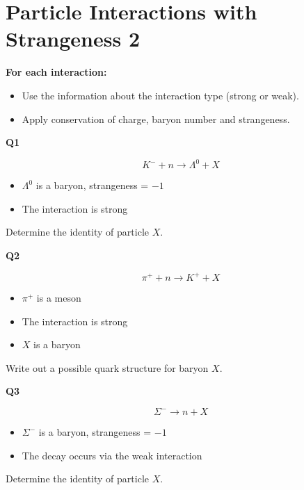 \documentclass[12pt]{article}
\begin{document}
\section*{Particle Interactions with Strangeness 2}

\textbf{For each interaction:}

\begin{itemize}
    \item Use the information about the interaction type (strong or weak).
    \item Apply conservation of charge, baryon number and strangeness.
\end{itemize}

\vspace{1em}

\textbf{Q1}

\[
K^- + n \rightarrow \Lambda^0 + X
\]

\begin{itemize}
    \item $\Lambda^0$ is a baryon, strangeness = $-1$
    \item The interaction is strong
\end{itemize}

Determine the identity of particle $X$.

\vspace{3em}

\textbf{Q2}

\[
\pi^+ + n \rightarrow K^+ + X
\]

\begin{itemize}
    \item $\pi^+$ is a meson
    \item The interaction is strong
    \item $X$ is a baryon
\end{itemize}

Write out a possible quark structure for baryon $X$.

\vspace{3em}

\textbf{Q3}

\[
\Sigma^- \rightarrow n + X
\]

\begin{itemize}
    \item $\Sigma^-$ is a baryon, strangeness = $-1$
    \item The decay occurs via the weak interaction
\end{itemize}

Determine the identity of particle $X$.
\end{document}
